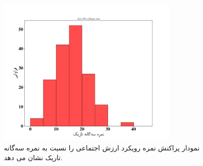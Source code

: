 \begin{figure}[htpb]
    \centering
    \includegraphics[width=0.8\textwidth]{./img/SexToDTR.pdf}
    \caption{نمودار پراکنش نمره رویکرد ارزش اجتماعی را نسبت به نمره سه‌گانه تاریک نشان می دهد. }
    \label{fig:SexToDTR}
\end{figure}


